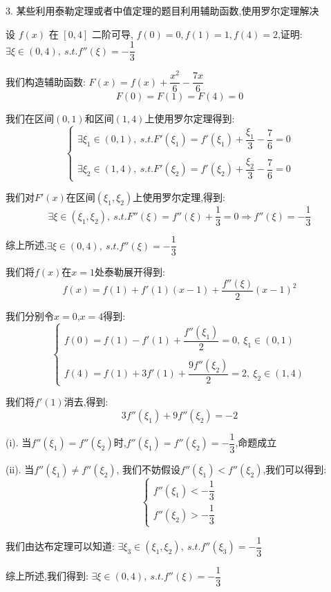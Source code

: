
3. 某些利用泰勒定理或者中值定理的题目利用辅助函数,使用罗尔定理解决
\begin{proposition}
	设 $f(x)$ 在 $[0,4]$ 二阶可导, $f(0)=0,f(1)=1,f(4)=2$,证明: $\exists \xi\in(0,4),\ s.t. f''(\xi)=-\dfrac{1}{3}$
\end{proposition}
\begin{solution}

	我们构造辅助函数:  $F(x)=f(x)+\dfrac{x^2}{6}-\dfrac{7x}{6}$
	$$F(0)=F(1)=F(4)=0$$

	我们在区间$(0,1)$和区间$(1,4)$上使用罗尔定理得到:
	$$\left\lbrace
		\begin{array}{l}
			\exists \xi_{1}\in(0,1),\ s.t. F'(\xi_{1})=f'(\xi_{1})+\dfrac{\xi_{1}}{3}-\dfrac{7}{6}=0 \\

			\\
			\exists \xi_{2}\in(1,4),\ s.t. F'(\xi_{2})=f'(\xi_{2})+\dfrac{\xi_{2}}{3}-\dfrac{7}{6}=0
		\end{array}
		\right.$$

	我们对$F'(x)$在区间$(\xi_{1},\xi_{2})$上使用罗尔定理,得到:
	$$\exists \xi\in(\xi_{1},\xi_{2}),\ s.t. F''(\xi)=f''(\xi)+\dfrac{1}{3}=0\Rightarrow f''(\xi)=-\dfrac{1}{3}$$

	综上所述,$\exists \xi\in(0,4),\ s.t. f''(\xi)=-\dfrac{1}{3}$
\end{solution}
\begin{anymark}[注: 泰勒展开]
	我们将$f(x)$在$x=1$处泰勒展开得到:
	$$f(x)=f(1)+f'(1)(x-1)+\dfrac{f''(\xi)}{2}(x-1)^2$$

	我们分别令$x=0$,$x=4$得到:
	$$\left\lbrace
		\begin{array}{l}
			f(0)=f(1)-f'(1)+\dfrac{f''(\xi_{1})}{2}=0,\ \xi_{1}\in(0,1) \\
			\\
			f(4)=f(1)+3f'(1)+\dfrac{9f''(\xi_{2})}{2}=2,\ \xi_{2}\in(1,4)
		\end{array}
		\right. $$

	我们将$f'(1)$消去,得到:
	$$3f''(\xi_{1})+9f''(\xi_{2})=-2$$

	(i). 当$f''(\xi_{1})=f''(\xi_{2})$时,$f''(\xi_{1})=f''(\xi_{2})=-\dfrac{1}{3}$,命题成立

	(ii). 当$f''(\xi_{1})\neq f''(\xi_{2})$, 我们不妨假设$f''(\xi_{1})<f''(\xi_{2})$,我们可以得到:
	$$\left\lbrace
		\begin{array}{l}
			f''(\xi_{1})<-\dfrac{1}{3} \\
			f''(\xi_{2})>-\dfrac{1}{3}
		\end{array}
		\right. $$

	我们由达布定理可以知道: $\exists \xi_{3}\in(\xi_{1},\xi_{2}),\ s.t. f''(\xi_{3})=-\dfrac{1}{3}$

	综上所述,我们得到: $\exists\xi\in(0,4),\ s.t. f''(\xi)=-\dfrac{1}{3}$
\end{anymark}

